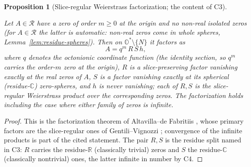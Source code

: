 \documentclass[11pt]{article}
\newcommand{\OO}{\mathbb{O}}
\newcommand{\CC}{\mathbb{C}}
\newcommand{\RR}{\mathbb{R}}
\providecommand{\lean}[1]{}
\providecommand{\uses}[1]{}
\theoremstyle{plain}
\newtheorem{proposition}[theorem]{Proposition}
\theoremstyle{definition}
\theoremstyle{remark}
\begin{document}
\begin{proposition}[Slice-regular Weierstrass factorization; the content of C3]\label{prop:weierstrass}
\lean{weierstrassE, spherePrimary, ASection.c3_multipliable,
ASection.c3_locMajorant, ASection.c3_factorization}
\uses{def:R}
Let $A\in\mathcal R$ have a zero of order $m\ge 0$ at the origin and no non-real isolated zeros
\textup{(}for $A\in\mathcal R$ the latter is automatic: non-real zeros come in whole spheres,
Lemma~\ref{lem:residue-spheres}\textup{)}. Then on $\OO^{*}\setminus\{N\}$ it factors as
\[
  A=q^{m}\,R\,S\,h,
\]
where $q$ denotes the octonionic coordinate function \textup{(}the identity section, so $q^m$
carries the order-$m$ zero at the origin\textup{)}, $R$ is a slice-preserving factor vanishing
exactly at the real zeros of $A$, $S$ is a factor vanishing exactly at its spherical
\textup{(}residue-$\CC$\textup{)} zero-spheres, and $h$ is never vanishing; each of $R,S$ is the
slice-regular Weierstrass product over the corresponding zeros. The factorization holds
\emph{including the case where either family of zeros is infinite}.
\end{proposition}
\begin{proof}
This is the factorization theorem of Altavilla--de Fabritiis \cite[Prop.~3.1, Thm.~3.2]{AdFslice},
whose primary factors are the slice-regular ones of Gentili--Vignozzi \cite{GV}; convergence of
the infinite products is part of the cited statement. The pair $R,S$ is the residue split named
in \textup{C3}: $R$ carries the residue-$\RR$ \textup{(}classically trivial\textup{)} zeros and
$S$ the residue-$\CC$ \textup{(}classically nontrivial\textup{)} ones, the latter infinite in
number by \textup{C4}.
\end{proof}
\end{document}
